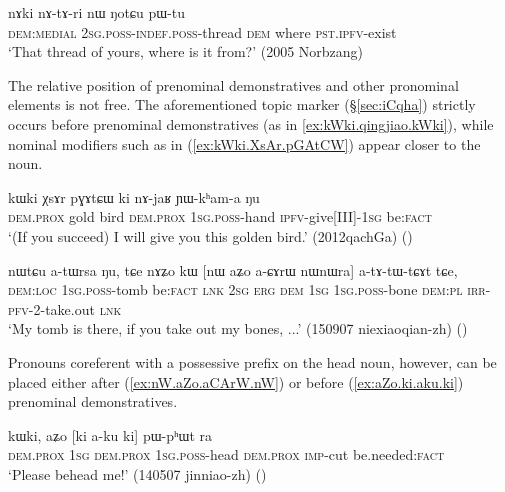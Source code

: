 \begin{exe}
\ex \label{ex:nAki.nAtAri}
 \gll nɤki nɤ-tɤ-ri nɯ ŋotɕu pɯ-tu \\
 \textsc{dem}:\textsc{medial} \textsc{2sg}.\textsc{poss}-\textsc{indef}.\textsc{poss}-thread \textsc{dem} where \textsc{pst}.\textsc{ipfv}-exist \\
\glt `That thread of yours, where is it from?' (2005 Norbzang)
\end{exe}

The relative position of prenominal demonstratives and other pronominal elements is not free. The aforementioned topic marker  (§\ref{sec:iCqha}) strictly occurs before prenominal demonstratives (as in \ref{ex:kWki.qingjiao.kWki}), while nominal modifiers such as  in (\ref{ex:kWki.XsAr.pGAtCW}) appear closer to the noun. 

\begin{exe}
\ex \label{ex:kWki.XsAr.pGAtCW}
 \gll kɯki χsɤr pɣɤtɕɯ ki nɤ-jaʁ ɲɯ-kʰam-a ŋu \\
\textsc{dem}.\textsc{prox} gold bird \textsc{dem}.\textsc{prox} \textsc{1sg}.\textsc{poss}-hand \textsc{ipfv}-give[III]-\textsc{1sg} be:\textsc{fact} \\
\glt `(If you succeed) I will give you this golden bird.' (2012qachGa)
()
\end{exe}

\begin{exe}
\ex \label{ex:nW.aZo.aCArW.nW}
 \gll nɯtɕu a-tɯrsa ŋu, tɕe nɤʑo kɯ [nɯ aʑo a-ɕɤrɯ nɯnɯra] a-tɤ-tɯ-tɕɤt tɕe, \\
 \textsc{dem}:\textsc{loc} \textsc{1sg}.\textsc{poss}-tomb be:\textsc{fact} \textsc{lnk} \textsc{2sg} \textsc{erg} \textsc{dem} \textsc{1sg} \textsc{1sg}.\textsc{poss}-bone \textsc{dem}:\textsc{pl} \textsc{irr}-\textsc{pfv}-2-take.out \textsc{lnk} \\
\glt `My tomb is there, if you take out my bones, ...' (150907 niexiaoqian-zh)
()
\end{exe}

Pronouns coreferent with a possessive prefix on the head noun, however, can be placed either after (\ref{ex:nW.aZo.aCArW.nW}) or before (\ref{ex:aZo.ki.aku.ki}) prenominal demonstratives.

\begin{exe}
\ex \label{ex:aZo.ki.aku.ki}
 \gll  kɯki, aʑo [ki a-ku ki] pɯ-pʰɯt ra \\
 \textsc{dem}.\textsc{prox} \textsc{1sg}  \textsc{dem}.\textsc{prox} \textsc{1sg}.\textsc{poss}-head  \textsc{dem}.\textsc{prox} \textsc{imp}-cut be.needed:\textsc{fact} \\
 \glt `Please behead me!' (140507 jinniao-zh)
()
\end{exe}

